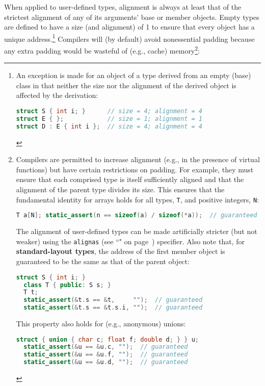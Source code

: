 When applied to user-defined types, alignment is always at least that of
the strictest alignment of any of its arguments' base or member objects.
Empty types are defined to have a size (and alignment) of 1 to
ensure that every object has a unique address.{\cprotect\footnote{An
exception is made for an object of a type derived from an empty (base)
class in that neither the size nor the alignment of the derived object
is affected by the derivation:

\begin{lstlisting}[language=C++, basicstyle={\ttfamily\footnotesize}]
struct S { int i; }      // size = 4; alignment = 4
struct E { };            // size = 1; alignment = 1
struct D : E { int i };  // size = 4; alignment = 4
\end{lstlisting}
      }} Compilers will (by default) avoid nonessential padding because any
extra padding would be wasteful of (e.g., cache)
memory{\cprotect\footnote{Compilers are permitted to increase alignment
(e.g., in the presence of virtual functions) but have certain restrictions
on padding. For example, they must ensure that each comprised type is
itself sufficiently aligned and that the alignment of the parent type
divides its size. This ensures that the fundamental identity for
arrays holds for all types, \texttt{T}, and positive integers,
\texttt{N}:

\begin{lstlisting}[language=C++, basicstyle={\ttfamily\footnotesize}]
T a[N]; static_assert(n == sizeof(a) / sizeof(*a));  // guaranteed
\end{lstlisting}

\noindent The alignment of user-defined types can be made artificially stricter
  (but not weaker) using the {\tt alignas} (see ``" on page~\pageref{alignas}) specifier.
  Also note that, for \textbf{standard-layout types}, the address of the
  first member object is guaranteed to be the same as that of the parent
  object:

  \begin{lstlisting}[language=C++, basicstyle={\ttfamily\footnotesize}]
  struct S { int i; }
  class T { public: S s; }
  T t;
  static_assert(&t.s == &t,     "");  // guaranteed
  static_assert(&t.s == &t.s.i, "");  // guaranteed
  \end{lstlisting}

\noindent This property also holds for (e.g., anonymous) unions:

  \begin{lstlisting}[language=C++, basicstyle={\ttfamily\footnotesize}]
  struct { union { char c; float f; double d; } } u;
  static_assert(&u == &u.c, "");  // guaranteed
  static_assert(&u == &u.f, "");  // guaranteed
  static_assert(&u == &u.d, "");  // guaranteed
  \end{lstlisting}
      }}:

